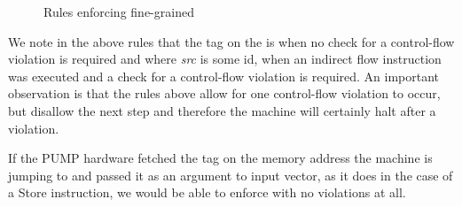 \begin{figure}[htb!]
\bigskip

\bigskip

\bigskip

\bigskip

\bigskip

\caption{Rules enforcing fine-grained \CFI{}}
\end{figure}

We note in the above rules that the tag on the \PCname is \DATAname when
no check for a control-flow violation is required and  where
\textit{src} is some id, when an indirect flow instruction was executed and a
check for a control-flow violation is required. An important observation is that
the rules above allow for one control-flow violation to occur, but disallow the
next step and therefore the machine will certainly halt after a violation.

If the PUMP hardware fetched the tag on the memory address the machine is
jumping to and passed it as an argument to input vector, as it does in the
case of a Store instruction, we would be able to enforce \CFI with no violations
at all. 






